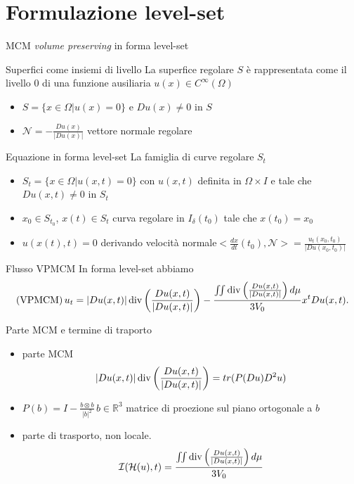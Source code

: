 \section{Formulazione level-set}
\begin{frame}{MCM \emph{volume preserving} in forma level-set}
  \begin{block}{Superfici come insiemi di livello}
    La superfice regolare $S$ è rappresentata come il livello $0$ di
    una funzione ausiliaria $u(x)\in C^{\infty}(\Omega)$
    \begin{itemize}
      \item $S=\{x\in\Omega | u(x)=0\}$ e $Du(x)\neq 0$ in $S$
      \item $\mathcal{N}=-\frac{Du(x)}{|Du(x)|}$ vettore normale
        regolare
    \end{itemize}
  \end{block}
  \begin{block}{Equazione in forma level-set}
    La famiglia di curve regolare $S_t$
    \begin{itemize}
      \item $S_t=\{x\in\Omega | u(x,t)=0\}$ con $u(x,t)$ definita in
        $\Omega\times I$ e tale che $Du(x,t)\neq 0$ in $S_t$
      \item $x_0\in S_{t_0}$, $x(t)\in S_t$ curva regolare in
        $I_{\delta}(t_0)$ tale che $x(t_0)=x_0$
      \item $u(x(t),t)=0$ derivando \alert{velocità normale}$<\frac{dx}{dt}(t_0),\mathcal{N}>=\frac{u_t(x_0,t_0)}{|Du(x_0,t_0)|}$
    \end{itemize}
  \end{block}
\end{frame}

\begin{frame}{Flusso VPMCM}
  In forma level-set abbiamo
    \[
      (\text{VPMCM})\,u_t=|Du(x,t)|\operatorname{div}\left(\frac{Du(x,t)}{|Du(x,t)|}\right)-\frac{\iint\operatorname{div}\left(\frac{Du(x,t)}{|Du(x,t)|}\right)d\mu}{3V_0}x^tDu(x,t). 
      \]
  \begin{block}{Parte MCM e termine di traporto} 
    \begin{itemize}
    \item parte MCM 
      \[
      |Du(x,t)|\operatorname{div}\left(\frac{Du(x,t)}{|Du(x,t)|}\right)=tr(P(Du)D^2u)
      \]
      \item $P(b)=I-\frac{b\otimes b}{|b|^2}\,b\in\mathbb{R}^3$
        matrice di proezione sul piano ortogonale a $b$
      \item parte di trasporto, non locale. 
        \[
        \mathcal{I}(\mathcal{H}(u),t)=\frac{\iint\operatorname{div}\left(\frac{Du(x,t)}{|Du(x,t)|}\right)d\mu}{3V_0}
        \]
     \end{itemize}
  \end{block}
\end{frame}

